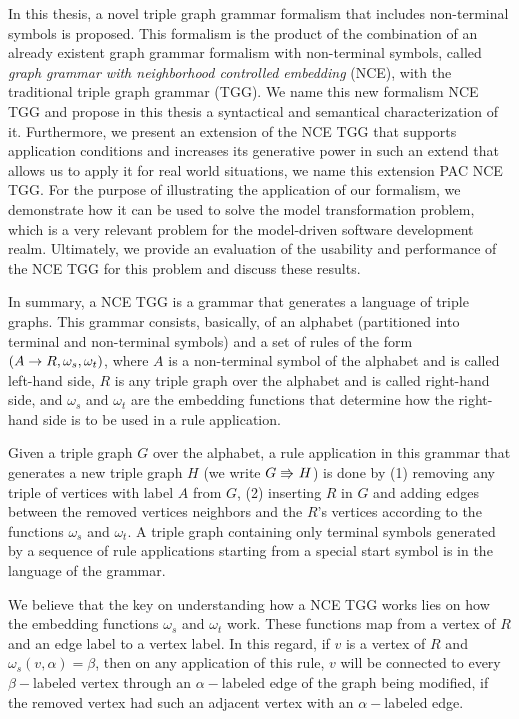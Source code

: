 In this thesis, a novel triple graph grammar formalism that includes non-terminal symbols is proposed. This formalism is the product of the combination of an already existent graph grammar formalism with non-terminal symbols, called \emph{graph grammar with neighborhood controlled embedding} (NCE), with the traditional triple graph grammar (TGG). We name this new formalism NCE TGG and propose in this thesis a syntactical and semantical characterization of it. Furthermore, we present an extension of the NCE TGG that supports application conditions and increases its generative power in such an extend that allows us to apply it for real world situations, we name this extension PAC NCE TGG. For the purpose of illustrating the application of our formalism, we demonstrate how it can be used to solve the model transformation problem, which is a very relevant problem for the model-driven software development realm. Ultimately, we provide an evaluation of the usability and performance of the NCE TGG for this problem and discuss these results.

In summary, a NCE TGG is a grammar that generates a language of triple graphs. This grammar consists, basically, of an alphabet (partitioned into terminal and non-terminal symbols) and a set of rules of the form $(A \to R,\omega_s,\omega_t)$, where $A$ is a non-terminal symbol of the alphabet and is called left-hand side, $R$ is any triple graph over the alphabet and is called right-hand side, and $\omega_s$ and $\omega_t$ are the embedding functions that determine how the right-hand side is to be used in a rule application.

Given a triple graph $G$ over the alphabet, a rule application in this grammar that generates a new triple graph $H$ (we write $G \tcderiv{}{}{} H$) is done by (1) removing any triple of vertices with label $A$ from $G$, (2) inserting $R$ in $G$ and adding edges between the removed vertices neighbors and the $R$'s vertices according to the functions $\omega_s$ and $\omega_t$. A triple graph containing only terminal symbols generated by a sequence of rule applications starting from a special start symbol is in the language of the grammar.

We believe that the key on understanding how a NCE TGG works lies on how the embedding functions $\omega_s$ and $\omega_t$ work. These functions map from a vertex of $R$ and an edge label to a vertex label. In this regard, if $v$ is a vertex of $R$ and $\omega_s(v,\alpha) = \beta$, then on any application of this rule, $v$ will be connected to every $\beta-$labeled vertex through an $\alpha-$labeled edge of the graph being modified, if the removed vertex had such an adjacent vertex with an $\alpha-$labeled edge.

